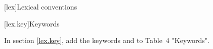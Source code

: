 
[lex]{Lexical conventions}

\setcounter{section}{11}
[lex.key]{Keywords}

In section \ref{lex.key}, add the keywords  and
 to Table~4 "Keywords".

